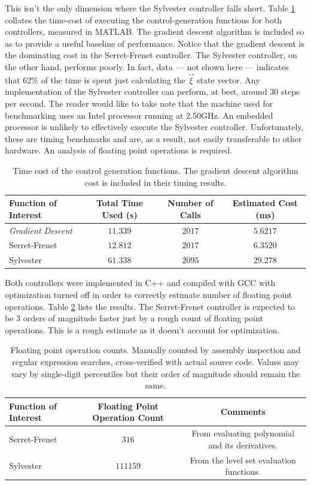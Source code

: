 \documentclass[oneside, 11pt]{book}
\begin{document}
This isn't the only dimension where the Sylvester controller falls short. Table \ref{tab:perf_simple} collates the time-cost of executing the control-generation functions for both controllers, measured in MATLAB. The gradient descent algorithm is included so as to provide a useful baseline of performance. Notice that the gradient descent is the dominating cost in the Serret-Frenet controller. The Sylvester controller, on the other hand, performs poorly. In fact, data --- not shown here --- indicates that 62\% of the time is spent just calculating the $\vec{\xi}$ state vector. Any implementation of the Sylvester controller can perform, at best, around 30 steps per second. The reader would like to take note that the machine used for benchmarking uses an Intel processor running at 2.50GHz. An embedded processor is unlikely to effectively execute the Sylvester controller. Unfortunately, these are timing benchmarks and are, as a result, not easily transferable to other hardware. An analysis of floating point operations is required.
\begin{table}[!htbp]
    \centering
    \begin{tabular}{l|c|c|c}
        Function of Interest & Total Time Used (s) & Number of Calls & Estimated Cost (ms) \\ \hline
        \emph{Gradient Descent} & $11.339$ & $2017$ & $5.6217$\\ \hline
        Serret-Frenet & $12.812$ & $2017$ & $6.3520$ \\ \hline
        Sylvester & $61.338$ & $2095$ & $29.278$
    \end{tabular}
    \caption{Time cost of the control generation functions. The gradient descent algorithm cost is included in their timing results.}
    \label{tab:perf_simple}
\end{table}

Both controllers were implemented in C++ and compiled with GCC with optimization turned off in order to correctly estimate number of floating point operations. Table \ref{tab:perf_flop} lists the results. The Serret-Frenet controller is expected to be 3 orders of magnitude faster just by a rough count of floating point operations. This is a rough estimate as it doesn't account for optimization.

\begin{table}[!htbp]
    \centering
    \begin{tabular}{l|c|c}
        Function of Interest & Floating Point Operation Count & Comments\\ \hline
        Serret-Frenet & $316$ & From evaluating polynomial and its derivatives.\\  \hline
        Sylvester & $111159$ & From the level set evaluation functions.
    \end{tabular}
    \caption{Floating point operation counts. Manually counted by assembly inspection and regular expression searches, cross-verified with actual source code. Values may vary by single-digit percentiles but their order of magnitude should remain the same.}
    \label{tab:perf_flop}
\end{table}
\end{document}

